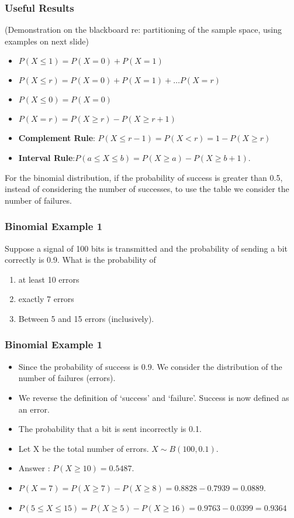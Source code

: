\begin{frame}
\frametitle{Useful Results}
(Demonstration on the blackboard re: partitioning of the sample space, using examples on next slide)
\begin{itemize}
\item $P(X \leq 1) = P(X=0) + P(X=1)$
\item $P(X \leq r) = P(X=0)+ P(X=1) + \ldots P(X= r)$
\item $P(X \leq 0) = P(X=0)$
\item $P(X = r) = P(X \geq r ) - P(X \geq r + 1)$
\item \textbf{Complement Rule}: $P(X \leq r-1) = P(X < r) = 1 - P(X \geq r)$
\item \textbf{Interval Rule}:$ P(a \leq X \leq  b)= P(X \geq a) - P(X \geq b + 1).$
\end{itemize}
For the binomial distribution, if the probability of success is greater than 0.5, instead of
considering the number of successes, to use the table we consider
the number of failures.
\end{frame}


\begin{frame}
\frametitle{Binomial Example 1}
Suppose a signal of 100 bits is transmitted and the probability of
sending a bit correctly is 0.9. What is the probability of
\begin{enumerate}
\item at least 10 errors
\item exactly 7 errors
\item Between 5 and 15 errors (inclusively).
\end{enumerate}
\end{frame}
\begin{frame}
\frametitle{Binomial Example 1}
\begin{itemize}
\item Since the probability of success is 0.9. We consider the distribution
of the number of failures (errors).
\item We reverse the definition of `success' and `failure'. Success is now defined as an error.
\item The probability that a bit is sent incorrectly is 0.1.
\item Let X be the total number of errors. $X \sim B(100, 0.1)$.
\item Answer : $P(X \geq 10) = 0.5487$.
\item $P(X = 7)=P(X \geq 7) - P(X \geq 8) =0.8828 - 0.7939 = 0.0889$.
\item $P(5 \leq X  \leq 15) = P(X \geq 5) - P(X \geq 16) =0.9763 - 0.0399 = 0.9364$
\end{itemize}
\end{frame}

